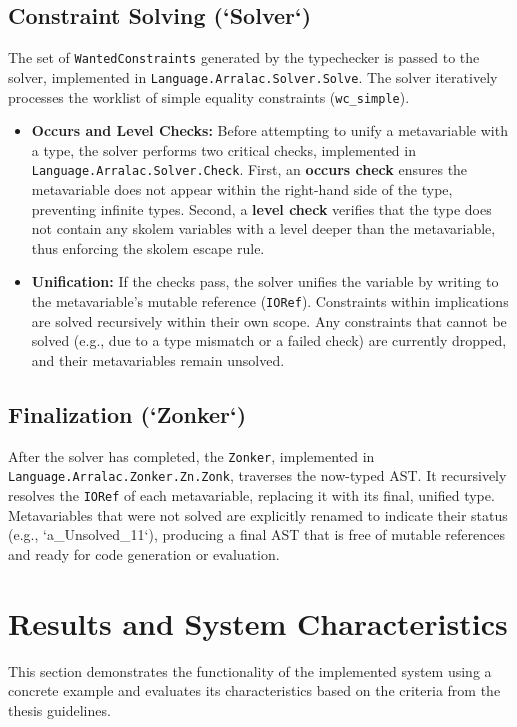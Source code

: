 \subsection{Constraint Solving (`Solver`)}
The set of \texttt{WantedConstraints} generated by the typechecker is passed to the solver, implemented in \texttt{Language.Arralac.Solver.Solve}. The solver iteratively processes the worklist of simple equality constraints (\texttt{wc\_simple}).
\begin{itemize}
    \item \textbf{Occurs and Level Checks:} Before attempting to unify a metavariable with a type, the solver performs two critical checks, implemented in \texttt{Language.Arralac.Solver.Check}. First, an \textbf{occurs check} ensures the metavariable does not appear within the right-hand side of the type, preventing infinite types. Second, a \textbf{level check} verifies that the type does not contain any skolem variables with a level deeper than the metavariable, thus enforcing the skolem escape rule.
    \item \textbf{Unification:} If the checks pass, the solver unifies the variable by writing to the metavariable's mutable reference (\texttt{IORef}). Constraints within implications are solved recursively within their own scope. Any constraints that cannot be solved (e.g., due to a type mismatch or a failed check) are currently dropped, and their metavariables remain unsolved.
\end{itemize}

\subsection{Finalization (`Zonker`)}
After the solver has completed, the \texttt{Zonker}, implemented in \texttt{Language.Arralac.Zonker.Zn.Zonk}, traverses the now-typed AST. It recursively resolves the \texttt{IORef} of each metavariable, replacing it with its final, unified type. Metavariables that were not solved are explicitly renamed to indicate their status (e.g., `a_Unsolved_11`), producing a final AST that is free of mutable references and ready for code generation or evaluation.

\section{Results and System Characteristics}
\label{sec:Implementation:Results}

This section demonstrates the functionality of the implemented system using a concrete example and evaluates its characteristics based on the criteria from the thesis guidelines.

